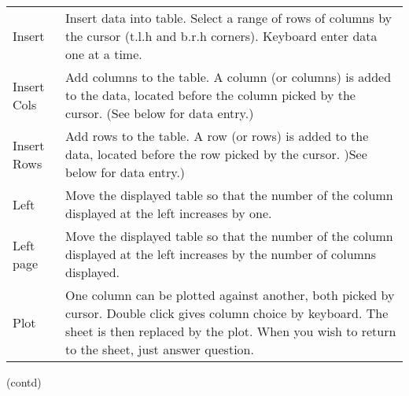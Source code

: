 \begin{small}
{{\begin{tabular}{|l|p{4.5in}|}
 Insert      &  Insert data into table. Select a range of rows
                of columns by the cursor (t.l.h and b.r.h
                corners). Keyboard enter data one at a time. \\
 Insert Cols &  Add columns to the table. A column (or columns)
                is added to the data, located before the
                column picked by the cursor. (See below for
                data entry.) \\
 Insert Rows &  Add rows to the table. A row (or rows)
                is added to the data, located before the
                row picked by the cursor. )See below for
                data entry.) \\
 Left        &  Move the displayed table so that the number
                of the column displayed at the left increases
                by one. \\
 Left page   &  Move the displayed table so that the number
                of the column displayed at the left increases
                by the number of columns displayed. \\
 Plot        &  One column can be plotted against another, both
                picked by cursor. Double click gives column
                choice by keyboard. The sheet is then
                replaced by the plot. When you wish
                to return to the sheet, just answer question. \\
\hline\end{tabular}

\newpage

(contd)

}}
\end{small}
